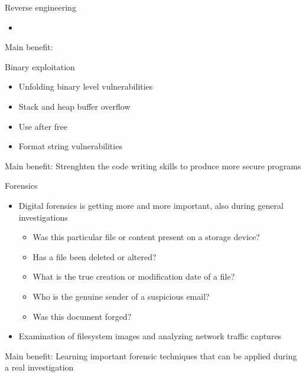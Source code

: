\documentclass[12 pt]{beamer}
\begin{document}

\begin{frame}{Reverse engineering}

  \begin{itemize}
    \item{}
  \end{itemize}

  \begin{exampleblock}{}
    Main benefit: 
  \end{exampleblock}

\end{frame}

\begin{frame}{Binary exploitation}

  \begin{itemize}
    \item{Unfolding binary level vulnerabilities}
    \item{Stack and heap buffer overflow}
    \item{Use after free}
    \item{Format string vulnerabilities}
  \end{itemize}

  \begin{exampleblock}{}
    Main benefit: Strenghten the code writing skills to produce more secure programs
  \end{exampleblock}

\end{frame}

\begin{frame}{Forensics}

  \begin{itemize}
    \item{Digital forensics is getting more and more important, also during general investigations}
      \begin{itemize}
        \item{Was this particular file or content present on a storage
          device?}
        \item{Has a file been deleted or altered?}
        \item{What is the true creation or modification date of a file?}
        \item{Who is the genuine sender of a suspicious email?}
        \item{Was this document forged?}
      \end{itemize}
    \item{Examination of filesystem images and analyzing network traffic captures}
  \end{itemize}

  \begin{exampleblock}{}
    Main benefit: Learning important forensic techniques that can be applied during a real investigation
  \end{exampleblock}

\end{frame}
\end{document}
